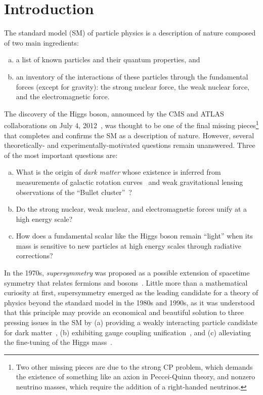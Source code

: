 \chapter{Introduction}
\label{ch:intro}

The standard model (SM) of particle physics is a description of nature
composed of two main ingredients:
\begin{enumerate}[(a)]
\item a list of known particles and their quantum properties, and
\item an inventory of the interactions of these particles through the fundamental forces
(except for gravity): the strong nuclear force, the weak nuclear force, and the electromagnetic
force. 
\end{enumerate}
The discovery of the Higgs boson, announced by the CMS and ATLAS
collaborations on July 4, 2012~\cite{CMShiggs,ATLAShiggs}, was
thought to be one of the final missing pieces\footnote{Two other missing
  pieces are due to the strong CP problem, which demands the existence of
  something like an axion in Peccei-Quinn theory, and nonzero neutrino masses, which require the addition of a right-handed neutrinos.} that completes and confirms the
SM as a description of nature. However, several theoretically- and
experimentally-motivated questions remain unanswered. Three
of the most important questions are:
\begin{enumerate}[(a)]
\item What is the origin of \emph{dark matter} whose existence is
  inferred from measurements of galactic rotation curves~\cite{1980ApJrotationcurves,1989HIrotationcurves} and weak gravitational lensing
  observations of the ``Bullet cluster''~\cite{Clowe:2006eq}?
\item Do the strong nuclear, weak nuclear, and electromagnetic
  forces unify at a high energy scale?
\item How does a fundamental scalar like the Higgs boson remain
  ``light'' when its mass is sensitive to new particles at high energy
  scales through radiative corrections?
\end{enumerate}

In the 1970s, \emph{supersymmetry} was proposed as a
possible extension of spacetime symmetry that relates fermions and
bosons~\cite{Ramond,Golfand,Volkov,Wess,Fayet}. Little
more than a mathematical curiosity at first, supersymmetry
emerged as the leading candidate for a theory of physics beyond the
standard model in the 1980s and 1990s, as it was understood that this 
principle may provide an economical and beautiful solution to
three pressing issues in the SM by (a) providing a weakly interacting particle candidate for dark
matter~\cite{Ellis:1983ew,Jungman:1995df}, (b) exhibiting gauge coupling
unification~\cite{Dimopoulos:1981yj,Marciano:1981un,Einhorn:1981sx,Ibanez:1981yh,Amaldi:1991cn,Langacker:1995fk},
and (c) alleviating the fine-tuning of the Higgs mass~\cite{Witten:1981nf,Dimopoulos:1981zb,Dine:1981za,Dimopoulos:1981au,Sakai:1981gr,Kaul:1981hi}.

